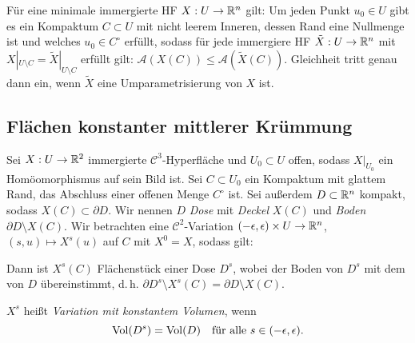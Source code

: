 \documentclass{cheat-sheet}
\newcommand{\A}{\mathcal{A}} %
\begin{document}
\begin{samepage}

\begin{satz}
  Für eine minimale immergierte HF $X : U \to \mathbb{R}^n$ gilt: Um jeden Punkt $u_0 \in U$ gibt es ein Kompaktum $C \subset U$ mit nicht leerem Inneren, dessen Rand eine Nullmenge ist und welches $u_0 \in C^\circ$ erfüllt, sodass für jede immergiere HF $\tilde{X} : U \to \mathbb{R}^n$ mit $X|_{U \setminus C} = \tilde{X}|_{U \setminus C}$ erfüllt gilt: $\A(X(C)) \leq \A(\tilde{X}(C))$. Gleichheit tritt genau dann ein, wenn $\tilde{X}$ eine Umparametrisierung von $X$ ist.
\end{satz}



\subsection{Flächen konstanter mittlerer Krümmung}

\end{samepage}

\begin{situation}
  Sei $X : U \to \mathbb{R}^2$ immergierte $\mathcal{C}^3$-Hyperfläche und $U_0 \subset U$ offen, sodass $X|_{U_0}$ ein Homöomorphismus auf sein Bild ist. Sei $C \subset U_0$ ein Kompaktum mit glattem Rand, das Abschluss einer offenen Menge $C^\circ$ ist. Sei außerdem $D \subset \mathbb{R}^n$ kompakt, sodass $X(C) \subset \partial D$. Wir nennen $D$ \emph{Dose} mit \emph{Deckel} $X(C)$ und \emph{Boden} $\partial D \setminus X(C)$. Wir betrachten eine $\mathcal{C}^2$-Variation $\left( -\epsilon, \epsilon \right) \times U \to \mathbb{R}^n$, $(s, u) \mapsto X^s(u)$ auf $C$ mit $X^0 = X$, sodass gilt:

  \begin{itemize}
  \end{itemize}

  Dann ist $X^s(C)$ Flächenstück einer Dose $D^s$, wobei der Boden von $D^s$ mit dem von $D$ übereinstimmt, d.\,h. $\partial D^s \setminus X^s(C) = \partial D \setminus X(C)$.
\end{situation}

\begin{defn}
  $X^s$ heißt \emph{Variation mit konstantem Volumen}, wenn
  \[
    \mathrm{Vol}(D^s) = \mathrm{Vol}(D)
    \quad \text{für alle $s \in \left( -\epsilon, \epsilon \right)$}.
  \]
\end{defn}
\end{document}
